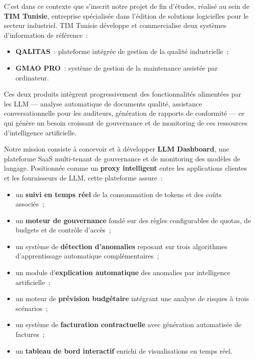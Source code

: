 \vspace{0.3cm}

C'est dans ce contexte que s'inscrit notre projet de fin d'études, réalisé au sein de \textbf{TIM Tunisie}, entreprise spécialisée dans l'édition de solutions logicielles pour le secteur industriel. TIM Tunisie développe et commercialise deux systèmes d'information de référence~:

\begin{itemize}[noitemsep]
    \item \textbf{QALITAS}~: plateforme intégrée de gestion de la qualité industrielle~;
    \item \textbf{GMAO PRO}~: système de gestion de la maintenance assistée par ordinateur.
\end{itemize}

Ces deux produits intègrent progressivement des fonctionnalités alimentées par les LLM --- analyse automatique de documents qualité, assistance conversationnelle pour les auditeurs, génération de rapports de conformité --- ce qui génère un besoin croissant de gouvernance et de monitoring de ces ressources d'intelligence artificielle.

\vspace{0.3cm}

Notre mission consiste à concevoir et à développer \textbf{LLM Dashboard}, une plateforme SaaS multi-tenant de gouvernance et de monitoring des modèles de langage. Positionnée comme un \textbf{proxy intelligent} entre les applications clientes et les fournisseurs de LLM, cette plateforme assure~:

\begin{itemize}[noitemsep]
    \item un \textbf{suivi en temps réel} de la consommation de tokens et des coûts associés~;
    \item un \textbf{moteur de gouvernance} fondé sur des règles configurables de quotas, de budgets et de contrôle d'accès~;
    \item un système de \textbf{détection d'anomalies} reposant sur trois algorithmes d'apprentissage automatique complémentaires~;
    \item un module d'\textbf{explication automatique} des anomalies par intelligence artificielle~;
    \item un moteur de \textbf{prévision budgétaire} intégrant une analyse de risques à trois scénarios~;
    \item un système de \textbf{facturation contractuelle} avec génération automatisée de factures~;
    \item un \textbf{tableau de bord interactif} enrichi de visualisations en temps réel.
\end{itemize}

